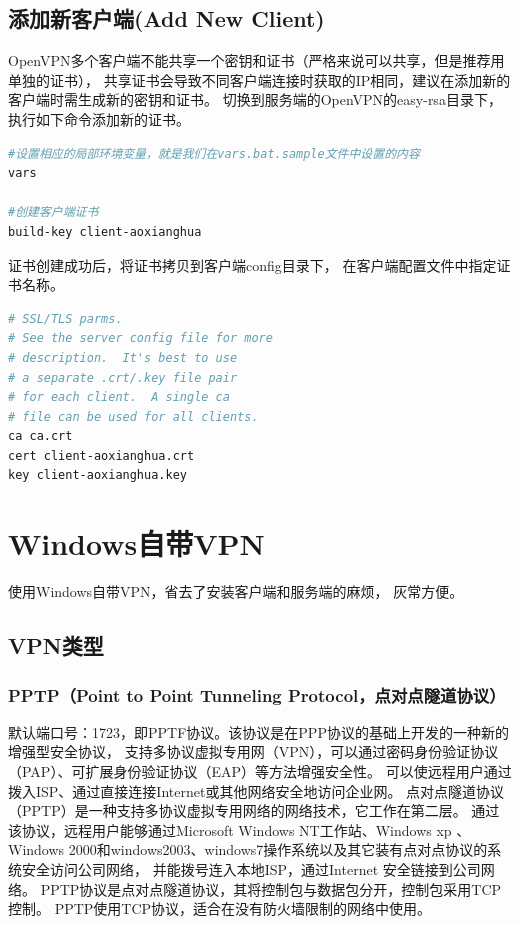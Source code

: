 \documentclass{book}
\begin{document}
\subsection{添加新客户端(Add New Client)}

OpenVPN多个客户端不能共享一个密钥和证书（严格来说可以共享，但是推荐用单独的证书），
共享证书会导致不同客户端连接时获取的IP相同，建议在添加新的客户端时需生成新的密钥和证书。
切换到服务端的OpenVPN的easy-rsa目录下，执行如下命令添加新的证书。

\begin{lstlisting}[language=Bash]
#设置相应的局部环境变量，就是我们在vars.bat.sample文件中设置的内容
vars

#创建客户端证书
build-key client-aoxianghua
\end{lstlisting}

证书创建成功后，将证书拷贝到客户端config目录下，
在客户端配置文件中指定证书名称。

\begin{lstlisting}[language=Bash]
# SSL/TLS parms.
# See the server config file for more
# description.  It's best to use
# a separate .crt/.key file pair
# for each client.  A single ca
# file can be used for all clients.
ca ca.crt
cert client-aoxianghua.crt
key client-aoxianghua.key
\end{lstlisting}

\section{Windows自带VPN}

使用Windows自带VPN，省去了安装客户端和服务端的麻烦，
灰常方便。

\subsection{VPN类型}

\subsubsection{PPTP（Point to Point Tunneling Protocol，点对点隧道协议）}

默认端口号：1723，即PPTF协议。该协议是在PPP协议的基础上开发的一种新的增强型安全协议，
支持多协议虚拟专用网（VPN），可以通过密码身份验证协议（PAP）、可扩展身份验证协议（EAP）等方法增强安全性。
可以使远程用户通过拨入ISP、通过直接连接Internet或其他网络安全地访问企业网。
点对点隧道协议（PPTP）是一种支持多协议虚拟专用网络的网络技术，它工作在第二层。
通过该协议，远程用户能够通过Microsoft Windows NT工作站、Windows xp 、
Windows 2000和windows2003、windows7操作系统以及其它装有点对点协议的系统安全访问公司网络，
并能拨号连入本地ISP，通过Internet 安全链接到公司网络。
PPTP协议是点对点隧道协议，其将控制包与数据包分开，控制包采用TCP控制。
PPTP使用TCP协议，适合在没有防火墙限制的网络中使用。
\end{document}
